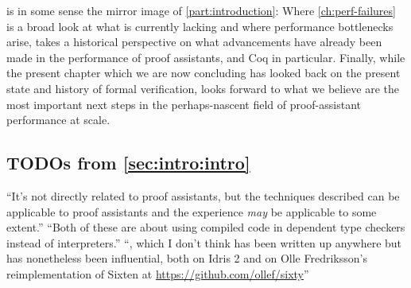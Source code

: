  is in some sense the mirror image of \autoref{part:introduction}:
Where \autoref{ch:perf-failures} is a broad look at what is currently lacking and where performance bottlenecks arise,  takes a historical perspective on what advancements have already been made in the performance of proof assistants, and Coq in particular.
Finally, while the present chapter which we are now concluding has looked back on the present state and history of formal verification,  looks forward to what we believe are the most important next steps in the perhaps-nascent field of proof-assistant performance at scale.

\begin{subappendices}

\section{TODOs from \autoref{sec:intro:intro}}
``It's not directly related to proof assistants, but the techniques described can be applicable to proof assistants and the experience \emph{may} be applicable to some extent.''
``Both of these are about using compiled code in dependent type checkers instead of interpreters.''
``, which I don't think has been written up anywhere but has nonetheless been influential, both on Idris 2 and on Olle Fredriksson's reimplementation of Sixten at \url{https://github.com/ollef/sixty}''



\end{subappendices}
